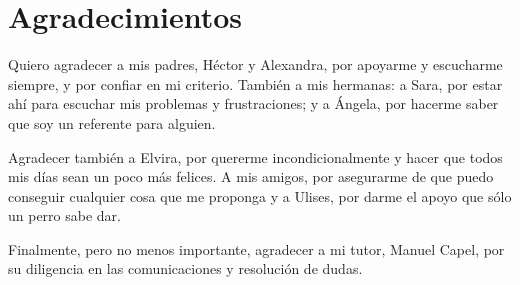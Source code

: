

\chapter{Agradecimientos}

Quiero agradecer a mis padres, Héctor y Alexandra, por apoyarme y escucharme siempre, y por confiar en mi criterio. 
También a mis hermanas: a Sara, por estar ahí para escuchar mis problemas y frustraciones; y a Ángela, por hacerme saber
que soy un referente para alguien.

\vspace{10pt}
Agradecer también a Elvira, por quererme incondicionalmente y hacer que todos mis días sean un poco más felices. A mis
amigos, por asegurarme de que puedo conseguir cualquier cosa que me proponga y a Ulises, por darme el apoyo que sólo un
perro sabe dar.

\vspace{10pt}
Finalmente, pero no menos importante, agradecer a mi tutor, Manuel Capel, por su diligencia en las comunicaciones y
resolución de dudas.

\cleardoublepage
\endinput
